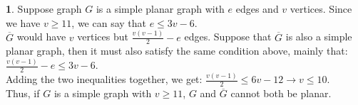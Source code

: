 \documentclass[12pt,a4paper]{article}
\theoremstyle{definition}
\newtheorem{problem}{}
\begin{document}
\begin{problem}

Suppose graph $G$ is a simple planar graph with $e$ edges and $v$ vertices. Since we have $v \geq 11$, we can say that $e \leq 3v - 6$. \\

$\overline{G}$ would have $v$ vertices but $\frac{v(v - 1)}{2} - e$ edges. Suppose that $\overline{G}$ is also a simple planar graph, then it must also satisfy the same condition above, mainly that: $\frac{v(v - 1)}{2} - e \leq 3v - 6$. \\

Adding the two inequalities together, we get: $\frac{v(v - 1)}{2} \leq 6v - 12 \rightarrow v \leq 10$. \\

Thus, if $G$ is a simple graph with $v \geq 11$, $G$ and $\overline{G}$ cannot both be planar.

\end{problem}
\end{document}
